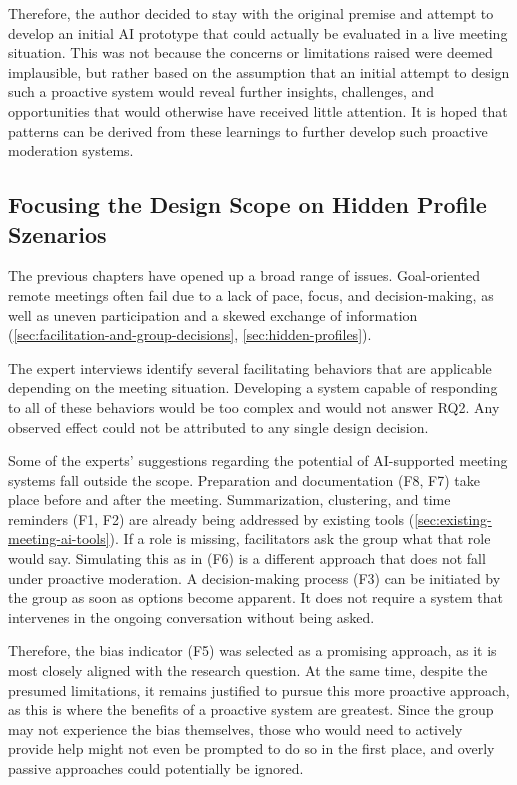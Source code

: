 Therefore, the author decided to stay with the original premise and attempt to develop an initial AI
prototype that could actually be evaluated in a live meeting situation.
This was not because the concerns or limitations raised were deemed implausible, but rather based on the
assumption that an initial attempt to design such a proactive system would reveal further insights,
challenges, and opportunities that would otherwise have received little attention.
It is hoped that patterns can be derived from these learnings to further develop such proactive moderation systems.

\subsection{Focusing the Design Scope on Hidden Profile Szenarios}

The previous chapters have opened up a broad range of issues. Goal-oriented remote meetings often fail due to
a lack of pace, focus, and decision-making, as well as uneven participation and a skewed exchange of
information (\autoref{sec:facilitation-and-group-decisions}, \autoref{sec:hidden-profiles}).

The expert interviews identify several facilitating behaviors that are applicable depending on the meeting
situation. Developing a system capable of responding to all of these behaviors would be too complex and would
not answer RQ2. Any observed effect could not be attributed to any single design decision.

Some of the experts’ suggestions regarding the potential of AI-supported meeting systems fall outside the
scope. Preparation and documentation (F8, F7) take place before and after the meeting.
Summarization, clustering, and time reminders (F1, F2) are already being addressed by existing tools
(\autoref{sec:existing-meeting-ai-tools}). If a role is missing, facilitators ask the group what that role
would say. Simulating this as in (F6) is a different approach that does not fall under proactive moderation.
A decision-making process (F3) can be initiated by the group as soon as options become apparent.  It does not
require a system that intervenes in the ongoing conversation without being asked.

Therefore, the bias indicator (F5) was selected as a promising approach, as it is most closely aligned with
the research question. At the same time, despite the presumed limitations, it remains justified to pursue
this more proactive approach, as this is where the benefits of a proactive system are greatest. Since the
group may not experience the bias themselves, those who would need to actively provide help might not even be
prompted to do so in the first place, and overly passive approaches could potentially be ignored.


